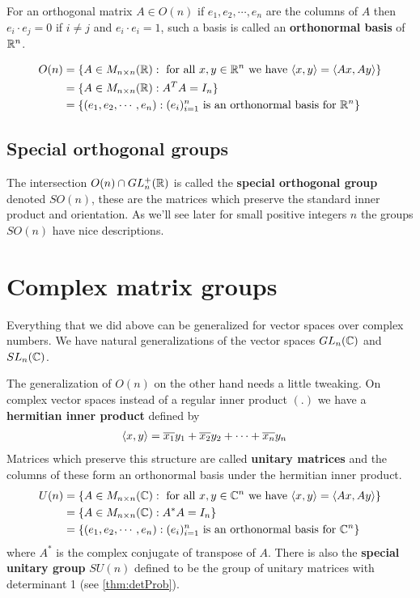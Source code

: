 For an orthogonal matrix $A \in O(n)$ if $e_1, e_2, \cdots, e_n$ are the columns of $A$ then $e_i \cdot e_j = 0$ if $i \neq j$ and $e_i \cdot e_i = 1$, such a basis is called an \textbf{orthonormal basis} of $\mathbb{R}^n$.

\begin{align}
	O(n)
	  & = \{ A \in M_{n \times n}(\mathbb{R}) : \mbox{ for all } x, y \in \mathbb{R}^n \mbox{ we have }\langle x, y \rangle = \langle Ax, Ay \rangle	\} \\
	  & = \{ A \in M_{n \times n}(\mathbb{R}) : A^T A = I_{n}\}                                                                   \\
	  & = \{ (e_1 , e_2 , \cdots , e_n) : (e_i)_{i=1}^n \mbox{ is an orthonormal basis for } \mathbb{R}^n\}
\end{align}

\subsection{Special orthogonal groups}
The intersection $O(n) \cap GL_n^+(\mathbb{R})$ is called the \textbf{special orthogonal group} denoted $SO(n)$, these are the matrices which preserve the standard inner product and orientation. As we'll see later for small positive integers $n$ the groups $SO(n)$ have nice descriptions.







\section{Complex matrix groups}
Everything that we did above can be generalized for vector spaces over complex numbers. We have natural generalizations of the vector spaces $GL_n(\mathbb{C})$ and $SL_n(\mathbb{C})$.

The generalization of $O(n)$ on the other hand needs a little tweaking. On complex vector spaces instead of a regular inner product $(.)$ we have a \textbf{hermitian inner product} defined by
\begin{align}
	\langle  x,  y \rangle & = \overline{x_1}{y_1} + \overline{x_2}{y_2} + \cdots + \overline{x_n}{y_n}
\end{align}
Matrices which preserve this structure are called \textbf{unitary matrices} and the columns of these form an orthonormal basis under the hermitian inner product.
\begin{align}
	U(n)
	  & = \{ A \in M_{n \times n}(\mathbb{C}) : \mbox{ for all } x, y \in \mathbb{C}^n \mbox{ we have }\langle x, y \rangle = \langle Ax, Ay \rangle	\} \\
	  & = \{ A \in M_{n \times n}(\mathbb{C}) : A^* A = I_{n}\}                                                                   \\
	  & = \{ (e_1 , e_2 , \cdots , e_n) : (e_i)_{i=1}^n \mbox{ is an orthonormal basis for } \mathbb{C}^n\}
\end{align}
where $A^*$ is the complex conjugate of transpose of $A$. There is also the \textbf{special unitary group} $SU(n)$ defined to be the group of unitary matrices with determinant 1 (see \ref{thm:detProb}).

